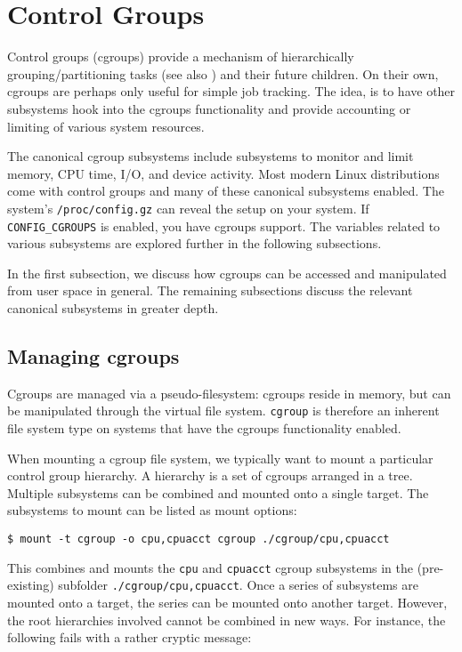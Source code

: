 
\section{Control Groups}

Control groups (cgroups) provide a mechanism of hierarchically
grouping/partitioning tasks (see also
) and their future
children\cite{cgroups-cgroups-since-linux-3.14}. On their own, cgroups are
perhaps only useful for simple job tracking. The idea, is to have other
subsystems hook into the cgroups functionality and provide accounting or
limiting of various system resources.

The canonical cgroup subsystems include subsystems to monitor and limit memory,
CPU time, I/O, and device activity. Most modern Linux distributions come with
control groups and many of these canonical subsystems enabled. The system's
\texttt{/proc/config.gz} can reveal the setup on your system\cite{man-5-proc}.
If \texttt{CONFIG\_CGROUPS} is enabled, you have cgroups support. The variables
related to various subsystems are explored further in the following
subsections.

In the first subsection, we discuss how cgroups can be accessed and manipulated
from user space in general. The remaining subsections discuss the relevant
canonical subsystems in greater depth.

\subsection{Managing cgroups}

Cgroups are managed via a pseudo-filesystem: cgroups reside in memory, but can
be manipulated through the virtual file system.  \texttt{cgroup} is therefore
an inherent file system type on systems that have the cgroups functionality
enabled.

When mounting a cgroup file system, we typically want to mount a particular
control group hierarchy. A hierarchy is a set of cgroups arranged in a tree.
Multiple subsystems can be combined and mounted onto a single target.  The
subsystems to mount can be listed as mount options:

\begin{lstlisting}
$ mount -t cgroup -o cpu,cpuacct cgroup ./cgroup/cpu,cpuacct
\end{lstlisting}

This combines and mounts the \texttt{cpu} and \texttt{cpuacct} cgroup
subsystems in the (pre-existing) subfolder \texttt{./cgroup/cpu,cpuacct}. Once
a series of subsystems are mounted onto a target, the series can be mounted
onto another target. However, the root hierarchies involved cannot be combined
in new ways. For instance, the following fails with a rather cryptic message:


